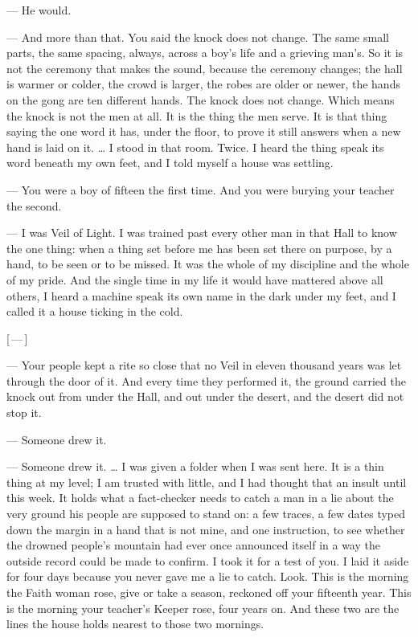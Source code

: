 \begin{room}
--- He would.

--- And more than that. You said the knock does not change. The same small parts, the same spacing, always, across a boy's life and a grieving man's. So it is not the ceremony that makes the sound, because the ceremony changes; the hall is warmer or colder, the crowd is larger, the robes are older or newer, the hands on the gong are ten different hands. The knock does not change. Which means the knock is not the men at all. It is the thing the men serve. It is that thing saying the one word it has, under the floor, to prove it still answers when a new hand is laid on it. \ldots{} I stood in that room. Twice. I heard the thing speak its word beneath my own feet, and I told myself a house was settling.

--- You were a boy of fifteen the first time. And you were burying your teacher the second.

--- I was Veil of Light. I was trained past every other man in that Hall to know the one thing: when a thing set before me has been set there on purpose, by a hand, to be seen or to be missed. It was the whole of my discipline and the whole of my pride. And the single time in my life it would have mattered above all others, I heard a machine speak its own name in the dark under my feet, and I called it a house ticking in the cold.

\centerline{[\,---\,]}

--- Your people kept a rite so close that no Veil in eleven thousand years was let through the door of it. And every time they performed it, the ground carried the knock out from under the Hall, and out under the desert, and the desert did not stop it.

--- Someone drew it.

--- Someone drew it. \ldots{} I was given a folder when I was sent here. It is a thin thing at my level; I am trusted with little, and I had thought that an insult until this week. It holds what a fact-checker needs to catch a man in a lie about the very ground his people are supposed to stand on: a few traces, a few dates typed down the margin in a hand that is not mine, and one instruction, to see whether the drowned people's mountain had ever once announced itself in a way the outside record could be made to confirm. I took it for a test of you. I laid it aside for four days because you never gave me a lie to catch. Look. This is the morning the Faith woman rose, give or take a season, reckoned off your fifteenth year. This is the morning your teacher's Keeper rose, four years on. And these two are the lines the house holds nearest to those two mornings.


\end{room}
